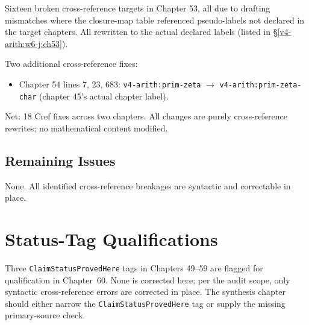 Sixteen broken cross-reference targets in Chapter 53, all due to
drafting mismatches where the closure-map table referenced
pseudo-labels not declared in the target chapters. All rewritten
to the actual declared labels (listed in \S\ref{v4-arith:w6-j:ch53}).

Two additional cross-reference fixes:
\begin{itemize}
\item Chapter 54 lines 7, 23, 683: \texttt{v4-arith:prim-zeta} \(\to\)
\texttt{v4-arith:prim-zeta-char} (chapter 45's actual chapter
label).
\end{itemize}

Net: 18 Cref fixes across two chapters. All changes are purely
cross-reference rewrites; no mathematical content modified.

\subsection{Remaining Issues}

None. All identified cross-reference breakages are syntactic and
correctable in place.

\section{Status-Tag Qualifications}
\label{v4-arith:w6-j:overclaim-ledger}

Three \texttt{ClaimStatusProvedHere} tags in Chapters 49--59 are
flagged for qualification in Chapter~60. None is corrected here;
per the audit scope, only syntactic cross-reference errors are
corrected in place. The synthesis chapter should either narrow the
\texttt{ClaimStatusProvedHere} tag or supply the missing
primary-source check.


